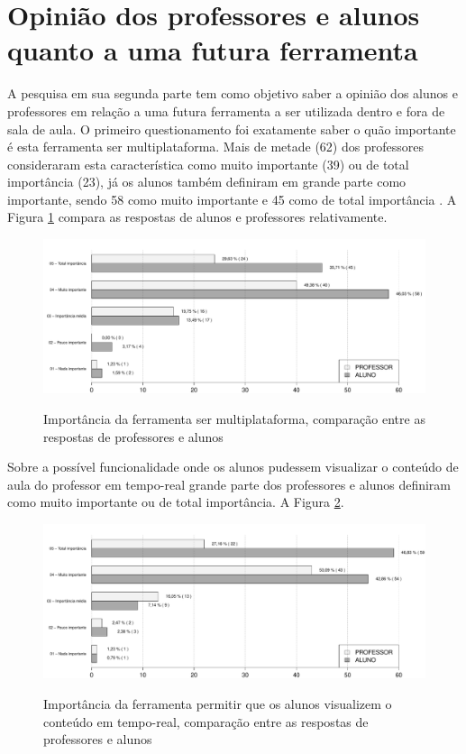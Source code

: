 \section{Opinião dos professores e alunos quanto a uma futura ferramenta}

A pesquisa em sua segunda parte tem como objetivo saber a opinião dos alunos e professores em relação a uma futura ferramenta a ser utilizada dentro e fora de sala de aula. O primeiro questionamento foi exatamente saber o quão importante é esta ferramenta ser multiplataforma. Mais de metade (62) dos professores consideraram esta característica como muito importante (39) ou de total importância (23), já os alunos também definiram em grande parte como importante, sendo 58 como muito importante e 45 como de total importância . A Figura \ref{fig:grafico_multiplataforma} compara as respostas de alunos e professores relativamente. 

\begin{figure}[!h]
\centering
\caption{Importância da ferramenta ser multiplataforma, comparação entre as respostas de professores e alunos}
\includegraphics[width=1.0\textwidth]{pdfs/alunos-professores/funcionalidades-multiplataforma2.pdf} 
\label{fig:grafico_multiplataforma} 
\end{figure}

Sobre a possível funcionalidade onde os alunos pudessem visualizar o conteúdo de aula do professor em tempo-real grande parte dos professores e alunos definiram como muito importante ou de total importância. A Figura \ref{fig:grafico_visualizar}.

\begin{figure}[!h]
\centering
\caption{Importância da ferramenta permitir que os alunos visualizem o conteúdo em tempo-real, comparação entre as respostas de professores e alunos}
\includegraphics[width=1.0\textwidth]{pdfs/alunos-professores/funcionalidades-visualizar-conteudo.pdf} 
\label{fig:grafico_visualizar} 
\end{figure}

